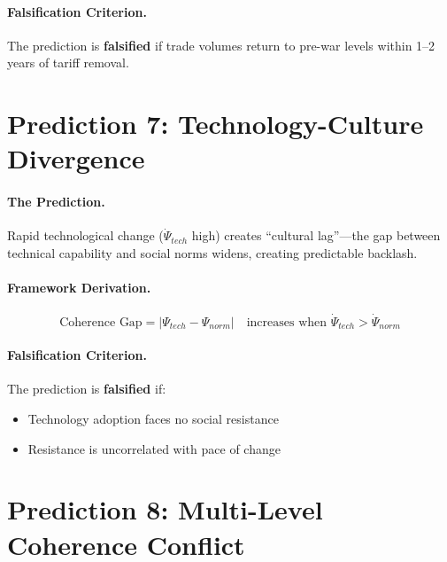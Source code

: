 \paragraph{Falsification Criterion.}
The prediction is \textbf{falsified} if trade volumes return to pre-war levels within 1--2 years of tariff removal.


\section{Prediction 7: Technology-Culture Divergence}
\label{sec:S-prediction7}

\paragraph{The Prediction.}
Rapid technological change ($\dot{\Psi}_{tech}$ high) creates ``cultural lag''---the gap between technical capability and social norms widens, creating predictable backlash.

\paragraph{Framework Derivation.}
\begin{equation}
    \text{Coherence Gap} = |\Psi_{tech} - \Psi_{norm}| \quad \text{increases when } \dot{\Psi}_{tech} > \dot{\Psi}_{norm}
\end{equation}

\paragraph{Falsification Criterion.}
The prediction is \textbf{falsified} if:
\begin{itemize}
    \item Technology adoption faces no social resistance
    \item Resistance is uncorrelated with pace of change
\end{itemize}


\section{Prediction 8: Multi-Level Coherence Conflict}
\label{sec:S-prediction8}

